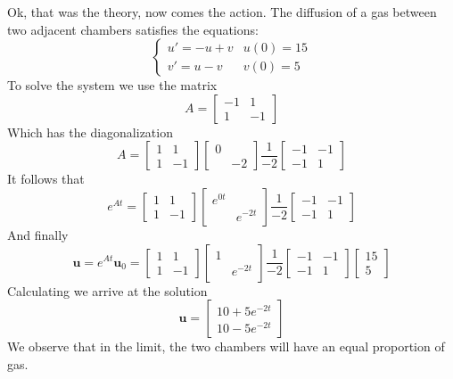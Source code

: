 \documentclass[11pt,oneside]{amsbook}
\theoremstyle{definition}
\theoremstyle{plain}
\theoremstyle{definition}
\theoremstyle{remark}
\numberwithin{equation}{section}
\numberwithin{figure}{section}
\begin{document}
Ok, that was the theory, now comes the action. The diffusion of a gas between two adjacent chambers satisfies the equations:
\[\begin{cases}
    u'=-u+v & u(0)=15\\
    v'=u-v & v(0)=5
  \end{cases}
\]
To solve the system we use the matrix
\[A=\begin{bmatrix}-1&1\\1&-1\end{bmatrix}
\]
Which has the diagonalization
\[A=\begin{bmatrix}1&1\\1&-1\end{bmatrix}
    \begin{bmatrix}0\\&-2\end{bmatrix}
    \frac{1}{-2}
    \begin{bmatrix}-1&-1\\-1&1\end{bmatrix}
\]
It follows that
\[e^{At}=\begin{bmatrix}1&1\\1&-1\end{bmatrix}
  \begin{bmatrix}e^{0t}\\&e^{-2t}\end{bmatrix}
  \frac{1}{-2}
  \begin{bmatrix}-1&-1\\-1&1\end{bmatrix}
\]
And finally
\[\mathbf{u}=e^{At}\mathbf{u}_0
  =\begin{bmatrix}1&1\\1&-1\end{bmatrix}
  \begin{bmatrix}1\\&e^{-2t}\end{bmatrix}
  \frac{1}{-2}
  \begin{bmatrix}-1&-1\\-1&1\end{bmatrix}
  \begin{bmatrix}15\\5\end{bmatrix}
\]
Calculating we arrive at the solution
\[\mathbf{u}
  =\begin{bmatrix}10+5e^{-2t}\\10-5e^{-2t}\end{bmatrix}
\]
We observe that in the limit, the two chambers will have an equal proportion of gas.
\end{document}
